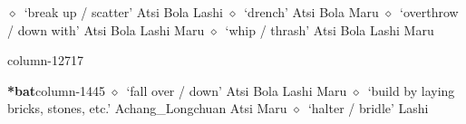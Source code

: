          $\diamond$~`break up / scatter'
         Atsi 
\hspace{1ex}
         Bola 
\hspace{1ex}
         Lashi 
\hspace{1ex}
         $\diamond$~`drench'
         Atsi 
\hspace{1ex}
         Bola 
\hspace{1ex}
         Maru 
\hspace{1ex}
         $\diamond$~`overthrow / down with'
         Atsi 
\hspace{1ex}
         Bola 
\hspace{1ex}
         Lashi 
\hspace{1ex}
         Maru 
\hspace{1ex}
         $\diamond$~`whip / thrash'
         Atsi 
\hspace{1ex}
         Bola 
\hspace{1ex}
         Lashi 
\hspace{1ex}
         Maru 
  \item {\footnotesize \textbf{}}{\tiny column-12717}
  \item {\footnotesize \textbf{*bat}}{\tiny column-1445}
         $\diamond$~`fall over / down'
         Atsi 
\hspace{1ex}
         Bola 
\hspace{1ex}
         Lashi 
\hspace{1ex}
         Maru 
\hspace{1ex}
         $\diamond$~`build by laying bricks, stones, etc.'
         Achang\_Longchuan 
\hspace{1ex}
         Atsi 
\hspace{1ex}
         Maru 
\hspace{1ex}
         $\diamond$~`halter / bridle'
         Lashi 
